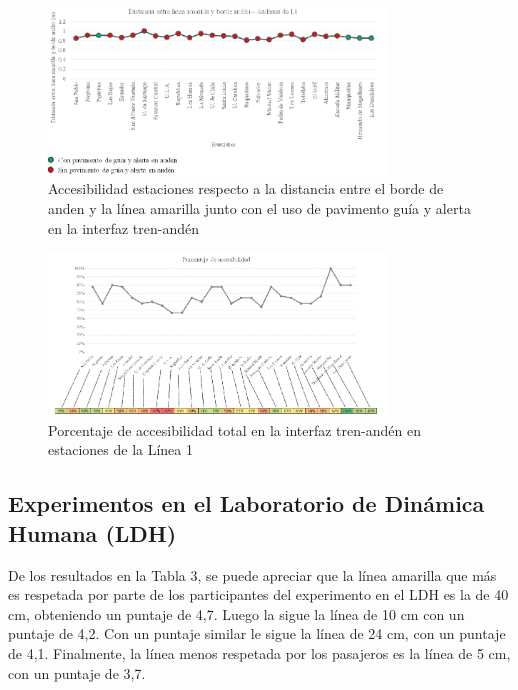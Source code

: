\begin{figure}
    \centering
    \includegraphics[width=0.8\textwidth]{imagenes/ilustracion_7.png}
    \caption{Accesibilidad estaciones respecto a la distancia entre el borde de anden y la línea amarilla junto con el uso de pavimento guía y alerta en la interfaz tren-andén}\label{fig7}
\end{figure}

\begin{figure}
    \centering
    \includegraphics[width=0.8\textwidth]{imagenes/ilustracion_8.png}
    \caption{Porcentaje de accesibilidad total en la interfaz tren-andén en estaciones de la Línea 1}\label{fig9}
\end{figure}

\subsection{Experimentos en el Laboratorio de Dinámica Humana (LDH)}
\label{sec4.3}
De los resultados en la Tabla 3, se puede apreciar que la línea amarilla que más es respetada por parte de los participantes del experimento en el LDH es la de 40 cm, obteniendo un puntaje de 4,7. Luego la sigue la línea de 10 cm con un puntaje de 4,2. Con un puntaje similar le sigue la línea de 24 cm, con un puntaje de 4,1. Finalmente, la línea menos respetada por los pasajeros es la línea de 5 cm, con un puntaje de 3,7.

